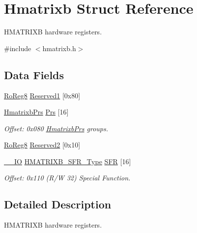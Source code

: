 \hypertarget{struct_hmatrixb}{}\section{Hmatrixb Struct Reference}
\label{struct_hmatrixb}


H\+M\+A\+T\+R\+I\+XB hardware registers.  




{\ttfamily \#include $<$hmatrixb.\+h$>$}

\subsection*{Data Fields}
\begin{DoxyCompactItemize}
\item 
\mbox{\hyperlink{group___s_a_m_d21_e15_a__definitions_ga0d957f1433aaf5d70e4dc2b68288442d}{Ro\+Reg8}} \mbox{\hyperlink{struct_hmatrixb_adf07006bcb3e805c94d1338914b6af31}{Reserved1}} \mbox{[}0x80\mbox{]}
\item 
\mbox{\hyperlink{struct_hmatrixb_prs}{Hmatrixb\+Prs}} \mbox{\hyperlink{struct_hmatrixb_a06b252755e60d6f1f2e86069f65d0f2a}{Prs}} \mbox{[}16\mbox{]}
\begin{DoxyCompactList}\small\item\em Offset\+: 0x080 \mbox{\hyperlink{struct_hmatrixb_prs}{Hmatrixb\+Prs}} groups. \end{DoxyCompactList}\item 
\mbox{\hyperlink{group___s_a_m_d21_e15_a__definitions_ga0d957f1433aaf5d70e4dc2b68288442d}{Ro\+Reg8}} \mbox{\hyperlink{struct_hmatrixb_ae2158c26e054ed7ec969e94e21328201}{Reserved2}} \mbox{[}0x10\mbox{]}
\item 
\mbox{\hyperlink{core__cm0plus_8h_aec43007d9998a0a0e01faede4133d6be}{\+\_\+\+\_\+\+IO}} \mbox{\hyperlink{union_h_m_a_t_r_i_x_b___s_f_r___type}{H\+M\+A\+T\+R\+I\+X\+B\+\_\+\+S\+F\+R\+\_\+\+Type}} \mbox{\hyperlink{struct_hmatrixb_abfa1c65cbc02f3c790a16cc9be798c90}{S\+FR}} \mbox{[}16\mbox{]}
\begin{DoxyCompactList}\small\item\em Offset\+: 0x110 (R/W 32) Special Function. \end{DoxyCompactList}\end{DoxyCompactItemize}


\subsection{Detailed Description}
H\+M\+A\+T\+R\+I\+XB hardware registers. 

